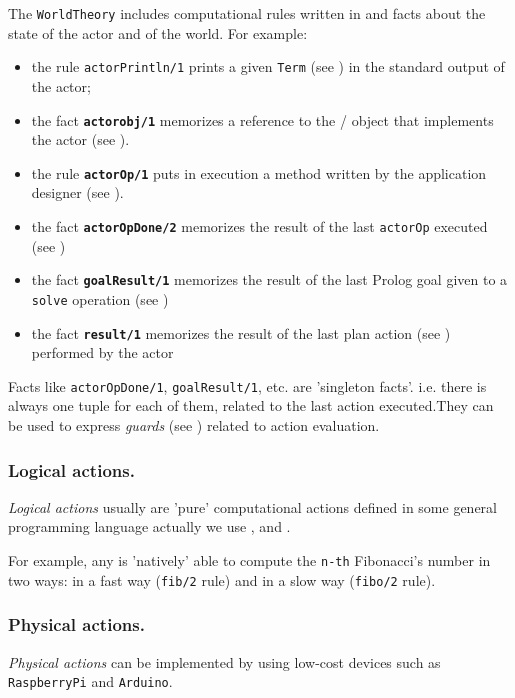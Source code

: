 The  \texttt{WorldTheory} includes computational rules written in \tuprolog{} and facts about the state of the actor and of the world. 
For example:
\begin{itemize}
\item the rule \texttt{actorPrintln/1} prints a given \tuprolog{} \texttt{Term} (see ) in the standard output of the actor;
\item the fact \texttt{\textbf{actorobj/1}} memorizes a reference to the \java{}/\akka{} object that implements the actor (see ).
\item the rule \texttt{\textbf{actorOp/1}} puts in execution a \java{} method written by the application designer (see ).
\item the fact \texttt{\textbf{actorOpDone/2}} memorizes the result of the last \texttt{actorOp} executed (see )
\item the fact \texttt{\textbf{goalResult/1}} memorizes the result of the last Prolog goal given to a \texttt{solve} operation (see )
\item  the fact \texttt{\textbf{result/1}} memorizes the result of the last plan action (see ) performed by the actor
\end{itemize}

Facts like \texttt{actorOpDone/1}, \texttt{goalResult/1}, etc. are 'singleton facts'. i.e. there is always one tuple for each of them, related to the last action executed.They can be used to express \textit{guards} (see ) related to action evaluation.

\subsubsection{Logical actions.}
\textit{Logical actions} usually are 'pure' computational actions defined in some general programming language  actually we use \java, \prolog{} and \javascript{}.

For example, any \qa{} is 'natively' able to compute the \texttt{n-th} Fibonacci's number in two ways: in a fast way (\texttt{fib/2} \prolog{} rule) and in a slow way (\texttt{fibo/2} \prolog{} rule).


\subsubsection{Physical actions.}
\textit{Physical actions} can be implemented by using low-cost devices such as \texttt{RaspberryPi} and \texttt{Arduino}.


